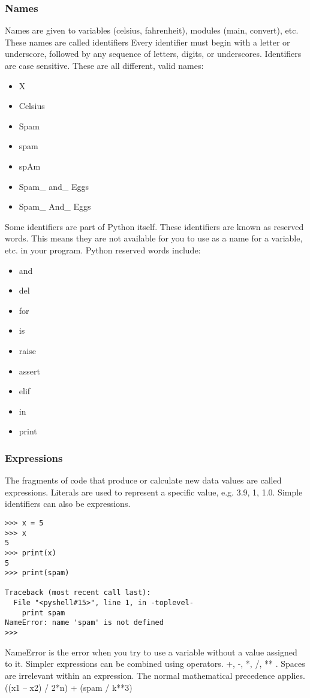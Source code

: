 \documentclass[12pt,a4paper,final,twoside,onecolumn,titlepage]{book}
\begin{document}
\subsubsection{Names}
Names are given to variables (celsius, fahrenheit), modules (main, convert), etc. These names are called identifiers Every identifier must begin with a letter or underscore, followed by any sequence of letters, digits, or underscores. Identifiers are case sensitive. These are all different, valid names:
\begin{itemize}
\item X
\item Celsius
\item Spam
\item spam
\item spAm
\item Spam\_ and\_ Eggs
\item Spam\_ And\_ Eggs
\end{itemize}
Some identifiers are part of Python itself. These identifiers are known as reserved words. This means they are not available for you to use as a name for a variable, etc. in your program. Python reserved words include:
\begin{itemize}
\item and 
\item del
\item for
\item is
\item raise
\item assert
\item elif
\item in
\item print
\end{itemize}
\subsubsection{Expressions}
The fragments of code that produce or calculate new data values are called expressions. Literals are used to represent a specific value, e.g. 3.9, 1, 1.0. Simple identifiers can also be expressions.
\lstset{language=Python, tabsize=4}
\begin{lstlisting}
>>> x = 5
>>> x
5
>>> print(x)
5
>>> print(spam)

Traceback (most recent call last):
  File "<pyshell#15>", line 1, in -toplevel-
    print spam
NameError: name 'spam' is not defined
>>> 
\end{lstlisting}
NameError is the error when you try to use a variable without a value assigned to it. Simpler expressions can be combined using operators. +, -, *, /, ** . Spaces are irrelevant within an expression. The normal mathematical precedence applies.
((x1 – x2) / 2*n) + (spam / k**3)
\end{document}
